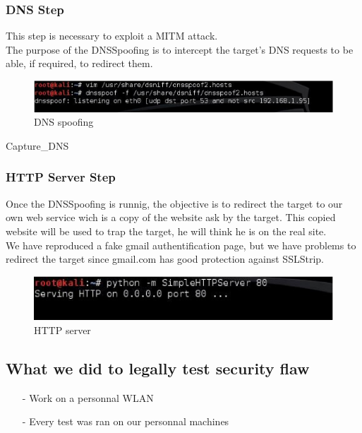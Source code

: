 \documentclass[a4paper, 11pt, oneside]{article}
\begin{document}
\subsubsection{DNS Step}
This step is necessary to exploit a MITM attack.\\
The purpose of the DNSSpoofing is to intercept the target's DNS requests to be able, if required, to redirect them.\\
\begin{figure}[!h]
	\centering
	\includegraphics[scale=0.80]{../images/dnsSpoof.eps}
	\caption{DNS spoofing}
	\label{DNS_spoofing}
\end{figure}
Capture_DNS 

\subsubsection{HTTP Server Step}
Once the DNSSpoofing is runnig, the objective is to redirect the target to our own web service wich is a copy of the website ask by the target.
This copied website will be used to trap the target, he will think he is on the real site.\\
We have reproduced a fake gmail authentification page, but we have problems to redirect the target since gmail.com has good protection against SSLStrip.
\begin{figure}[!h]
	\centering
	\includegraphics[scale=0.80]{../images/serverHTTP.eps}
	\caption{HTTP server}
	\label{serverHTTP}
\end{figure}

\subsection{What we did to legally test security flaw}
\begin{itemize}
    \item[-] Work on a personnal WLAN\\
    \item[-] Every test was ran on our personnal machines\\
\end{itemize}
\end{document}
